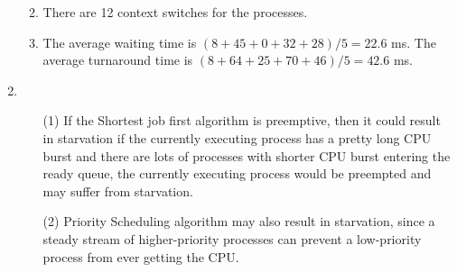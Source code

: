 \documentclass[12pt,a4paper]{article}
\begin{document}
\begin{enumerate}
\begin{enumerate}
				
				\item There are 12 context switches for the processes.
				
				\item The average waiting time is $(8+45+0+32+28)/5=22.6$ ms. The average turnaround time is $(8+64+25+70+46)/5=42.6$ ms.
			\end{enumerate}
		\item
		\begin{itemize}
			\item[(1)] If the Shortest job first algorithm is preemptive, then it could result in starvation if the currently executing process has a pretty long CPU burst and there are lots of processes with shorter CPU burst entering the ready queue, the currently executing process would be preempted and may suffer from starvation.
			
			\item[(2)] Priority Scheduling algorithm may also result in starvation, since a
			steady stream of higher-priority processes can prevent a low-priority process
			from ever getting the CPU.
		\end{itemize} 
		
	\end{enumerate}
\end{document}
